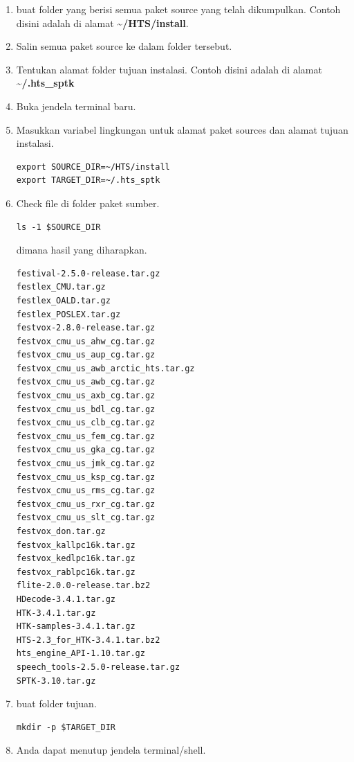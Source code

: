 \documentclass[12pt,]{article}
\begin{document}
	\begin{enumerate}
		\item buat folder yang berisi semua paket source yang telah dikumpulkan.
		Contoh disini adalah di alamat \textbf{\textasciitilde/HTS/install}.

		\item Salin semua paket source ke dalam folder tersebut.

		\item Tentukan alamat folder tujuan instalasi.
		Contoh disini adalah di alamat \textbf{\textasciitilde/.hts\_sptk}

		\item Buka jendela terminal baru.

		\item Masukkan variabel lingkungan untuk alamat paket sources dan alamat tujuan instalasi.
		\begin{verbatim}
export SOURCE_DIR=~/HTS/install
export TARGET_DIR=~/.hts_sptk
		\end{verbatim}

		\item Check file di folder paket sumber.
		\begin{verbatim}
ls -1 $SOURCE_DIR
		\end{verbatim}

		dimana hasil yang diharapkan.
	\begin{verbatim}
festival-2.5.0-release.tar.gz
festlex_CMU.tar.gz
festlex_OALD.tar.gz
festlex_POSLEX.tar.gz
festvox-2.8.0-release.tar.gz
festvox_cmu_us_ahw_cg.tar.gz
festvox_cmu_us_aup_cg.tar.gz
festvox_cmu_us_awb_arctic_hts.tar.gz
festvox_cmu_us_awb_cg.tar.gz
festvox_cmu_us_axb_cg.tar.gz
festvox_cmu_us_bdl_cg.tar.gz
festvox_cmu_us_clb_cg.tar.gz
festvox_cmu_us_fem_cg.tar.gz
festvox_cmu_us_gka_cg.tar.gz
festvox_cmu_us_jmk_cg.tar.gz
festvox_cmu_us_ksp_cg.tar.gz
festvox_cmu_us_rms_cg.tar.gz
festvox_cmu_us_rxr_cg.tar.gz
festvox_cmu_us_slt_cg.tar.gz
festvox_don.tar.gz
festvox_kallpc16k.tar.gz
festvox_kedlpc16k.tar.gz
festvox_rablpc16k.tar.gz
flite-2.0.0-release.tar.bz2
HDecode-3.4.1.tar.gz
HTK-3.4.1.tar.gz
HTK-samples-3.4.1.tar.gz
HTS-2.3_for_HTK-3.4.1.tar.bz2
hts_engine_API-1.10.tar.gz
speech_tools-2.5.0-release.tar.gz
SPTK-3.10.tar.gz
	\end{verbatim}

	\newpage
	\item buat folder tujuan.
	\begin{verbatim}
mkdir -p $TARGET_DIR
	\end{verbatim}

	\item Anda dapat menutup jendela terminal/shell.

	\end{enumerate}
\end{document}
